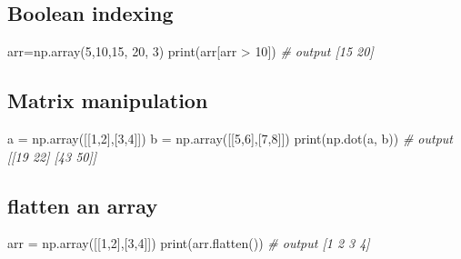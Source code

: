 \documentclass[11pt]{article}
\newenvironment{Shaded}{}{}
\newcommand{\DecValTok}[1]{\textcolor[rgb]{0.25,0.63,0.44}{{#1}}}
\newcommand{\CommentTok}[1]{\textcolor[rgb]{0.38,0.63,0.69}{\textit{{#1}}}}
\newcommand{\NormalTok}[1]{{#1}}
\newcommand{\OperatorTok}[1]{\textcolor[rgb]{0.40,0.40,0.40}{{#1}}}
\newcommand{\BuiltInTok}[1]{{#1}}
\begin{document}
\subsection{\texorpdfstring{{Boolean
indexing}}{Boolean indexing}}\label{boolean-indexing}

\begin{Shaded}
\begin{Highlighting}[]
\NormalTok{    arr}\OperatorTok{=}\NormalTok{np.array(}\DecValTok{5}\NormalTok{,}\DecValTok{10}\NormalTok{,}\DecValTok{15}\NormalTok{, }\DecValTok{20}\NormalTok{, }\DecValTok{3}\NormalTok{) }
    \BuiltInTok{print}\NormalTok{(arr[arr }\OperatorTok{\textgreater{}} \DecValTok{10}\NormalTok{])    }\CommentTok{\# output [15 20]}
\end{Highlighting}
\end{Shaded}

\subsection{\texorpdfstring{{Matrix
manipulation}}{Matrix manipulation}}\label{matrix-manipulation}

\begin{Shaded}
\begin{Highlighting}[]
\NormalTok{    a }\OperatorTok{=}\NormalTok{ np.array([[}\DecValTok{1}\NormalTok{,}\DecValTok{2}\NormalTok{],[}\DecValTok{3}\NormalTok{,}\DecValTok{4}\NormalTok{]])}
\NormalTok{    b }\OperatorTok{=}\NormalTok{ np.array([[}\DecValTok{5}\NormalTok{,}\DecValTok{6}\NormalTok{],[}\DecValTok{7}\NormalTok{,}\DecValTok{8}\NormalTok{]])}
    \BuiltInTok{print}\NormalTok{(np.dot(a, b))  }\CommentTok{\# output [[19 22] [43 50]]}
\end{Highlighting}
\end{Shaded}

\subsection{\texorpdfstring{{flatten an
array}}{flatten an array}}\label{flatten-an-array}

\begin{Shaded}
\begin{Highlighting}[]
\NormalTok{    arr }\OperatorTok{=}\NormalTok{ np.array([[}\DecValTok{1}\NormalTok{,}\DecValTok{2}\NormalTok{],[}\DecValTok{3}\NormalTok{,}\DecValTok{4}\NormalTok{]])}
    \BuiltInTok{print}\NormalTok{(arr.flatten())  }\CommentTok{\# output [1 2 3 4]}
\end{Highlighting}
\end{Shaded}
\end{document}
